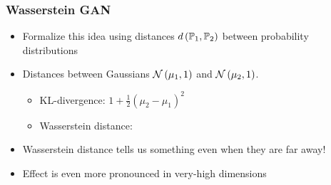\documentclass[10pt,mathserif]{beamer}
\begin{document}
\begin{frame}
  \frametitle{Wasserstein GAN}
 \begin{itemize}
 \item Formalize this idea using distances $d\left(\P_1, \P_2\right)$ between
   probability distributions
 \item Distances between Gaussians $\Gsn\left(\mu_1, 1\right)$ and
   $\Gsn\left(\mu_2, 1\right)$.
\begin{itemize}
  \item KL-divergence: $1 + \frac{1}{2} \left(\mu_2 - \mu_1\right)^2$
  \item Wasserstein distance:
\end{itemize}
\item Wasserstein distance tells us something even when they are far away!
\item Effect is even more pronounced in very-high dimensions
 \end{itemize}
\end{frame}
\end{document}
